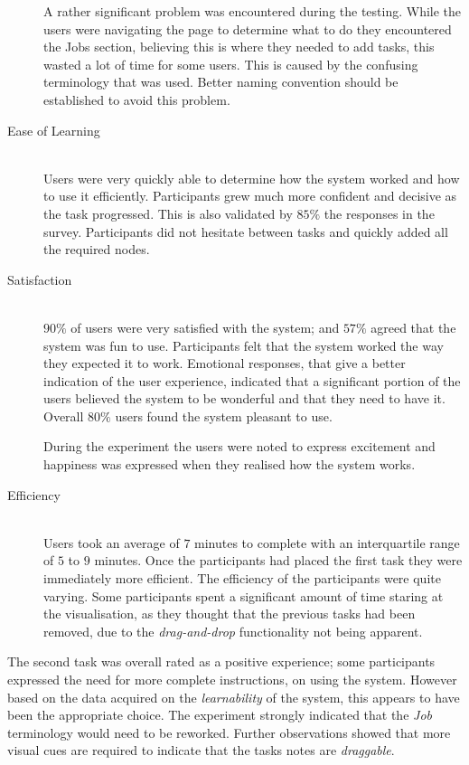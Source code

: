 \documentclass[12pt,a4paper]{report}
\begin{document}
\begin{description}
    A rather significant problem was encountered during the testing. While
    the users were navigating the page to determine what to do they encountered
    the Jobs section, believing this is where they needed to add tasks, this
    wasted a lot of time for some users. This is caused by the confusing
    terminology that was used. Better naming convention should be established to avoid
    this problem.
\item[Ease of Learning] \hfill \\
    Users were very quickly able to determine how the system worked and how to
    use it efficiently. Participants grew much more confident and decisive as
    the task progressed. This is also validated by $85\%$ the responses in
    the survey.
    Participants did not hesitate between tasks and quickly added all the
    required nodes.
\item[Satisfaction] \hfill \\
    $90\%$ of users were very satisfied with the system; and $57\%$ agreed
    that the  system was fun to use.
    Participants felt that the system worked the way
    they expected it to work. Emotional responses, that give a better indication of the user
    experience, indicated that a significant portion of the users believed the
    system to be wonderful and that they need to have it. Overall $80\%$
    users found
    the system pleasant to use.

    During the experiment the users were noted to express excitement and
    happiness was expressed when they realised how the system works.


\item[Efficiency] \hfill \\
    Users took an average of $7$ minutes to complete with an interquartile range
    of $5$ to $9$ minutes. Once the participants had placed the first task they
    were immediately more efficient. The efficiency of the participants were
    quite varying. Some participants spent a significant amount of time
    staring at the visualisation, as they thought that the previous tasks had
    been removed, due to the \emph{drag-and-drop} functionality not being
    apparent.
\end{description}

\noindent The second task was overall rated as a positive experience; some participants
expressed the need for more complete instructions, on using
the system. However based on the data acquired on the \emph{learnability} of the
system, this appears to have been the appropriate choice. The experiment strongly
indicated that the \emph{Job} terminology would need to be reworked. Further
observations showed that more visual cues are required to indicate that the
tasks notes are \emph{draggable}.
\end{document}
